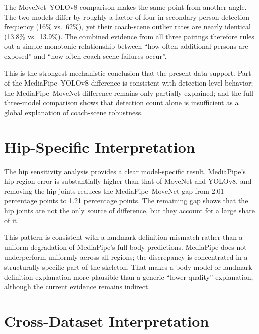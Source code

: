 The MoveNet--YOLOv8 comparison makes the same point from another angle. The two models differ by roughly a factor of four in secondary-person detection frequency (16\% vs.\ 62\%), yet their coach-scene outlier rates are nearly identical (13.8\% vs.\ 13.9\%). The combined evidence from all three pairings therefore rules out a simple monotonic relationship between ``how often additional persons are exposed'' and ``how often coach-scene failures occur''.

This is the strongest mechanistic conclusion that the present data support. Part of the MediaPipe--YOLOv8 difference is consistent with detection-level behavior; the MediaPipe--MoveNet difference remains only partially explained; and the full three-model comparison shows that detection count alone is insufficient as a global explanation of coach-scene robustness.


\section{Hip-Specific Interpretation}
\label{sec:hip-discussion}

The hip sensitivity analysis provides a clear model-specific result. MediaPipe's hip-region error is substantially higher than that of MoveNet and YOLOv8, and removing the hip joints reduces the MediaPipe--MoveNet gap from 2.01 percentage points to 1.21 percentage points. The remaining gap shows that the hip joints are not the only source of difference, but they account for a large share of it.

This pattern is consistent with a landmark-definition mismatch rather than a uniform degradation of MediaPipe's full-body predictions. MediaPipe does not underperform uniformly across all regions; the discrepancy is concentrated in a structurally specific part of the skeleton. That makes a body-model or landmark-definition explanation more plausible than a generic ``lower quality'' explanation, although the current evidence remains indirect.


\section{Cross-Dataset Interpretation}
\label{sec:crossdataset-discussion}


